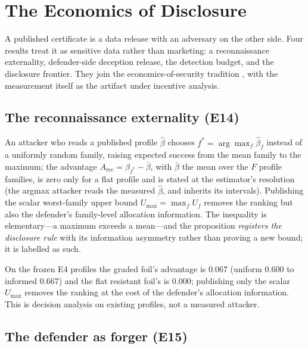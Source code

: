 \section{The Economics of Disclosure}\label{sec:disclosure}

A published certificate is a data release with an adversary on the other
side. Four results treat it as sensitive data rather than marketing: a
reconnaissance externality, defender-side deception release, the detection
budget, and the disclosure frontier. They join the economics-of-security
tradition \cite{anderson2006}, with the measurement itself as the artifact
under incentive analysis.

\subsection{The reconnaissance externality (E14)}\label{sec:recon}

\begin{proposition}\label{prop:recon}
An attacker who reads a published profile $\hat\beta$ chooses
$f^*=\arg\max_f\hat\beta_f$ instead of a uniformly random family, raising
expected success from the mean family to the maximum; the advantage
$A_{\mathrm{rec}}=\beta_{f^*}-\bar\beta$, with $\bar\beta$ the mean over
the $F$ profile families, is zero only for a flat profile and is stated at
the estimator's resolution (the argmax attacker reads the measured
$\hat\beta$, and inherits its intervals). Publishing the scalar worst-family upper bound
$U_{\max}=\max_f U_f$ removes the ranking but also the defender's family-level
allocation information. The inequality is elementary---a maximum exceeds
a mean---and the proposition \emph{registers the disclosure rule} with
its information asymmetry rather than proving a new bound; it is labelled
as such.
\end{proposition}

On the frozen E4 profiles the graded foil's advantage is $0.067$ (uniform
$0.600$ to informed $0.667$) and the flat resistant foil's is $0.000$;
publishing only the scalar $U_{\max}$ removes the ranking at the cost of the
defender's allocation information. This is decision analysis on existing
profiles, not a measured attacker.

\subsection{The defender as forger (E15)}\label{sec:release}

